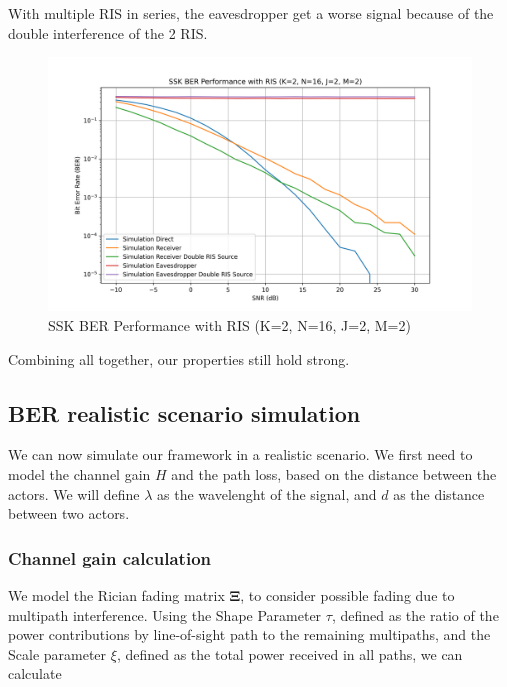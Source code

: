 With multiple RIS in series, the eavesdropper get a worse signal because of the double interference of the 2 RIS.

\begin{figure}[H]
  \centering
  \includegraphics[width=0.9\linewidth]{imgs/ber-simulations/SSK BER Performance with RIS (K=2, N=16, J=2, M=2).png}
  \caption{SSK BER Performance with RIS (K=2, N=16, J=2, M=2)}
  \label{fig:simulation_j2_m2}
\end{figure}

Combining all together, our properties still hold strong.

\newpage
\subsection{BER realistic scenario simulation}

We can now simulate our framework in a realistic scenario. We first need to model the channel gain $H$ and the path loss, based on the distance between the actors. We will define $\lambda$ as the wavelenght of the signal, and $d$ as the distance between two actors.

\subsubsection{Channel gain calculation}

We model the Rician fading \cite{Rician_fading} matrix $\bm{\Xi}$, to consider possible fading due to multipath interference. Using the Shape Parameter $\tau$, defined as the ratio of the power contributions by line-of-sight path to the remaining multipaths, and the Scale parameter $\xi$, defined as the total power received in all paths, we can calculate

